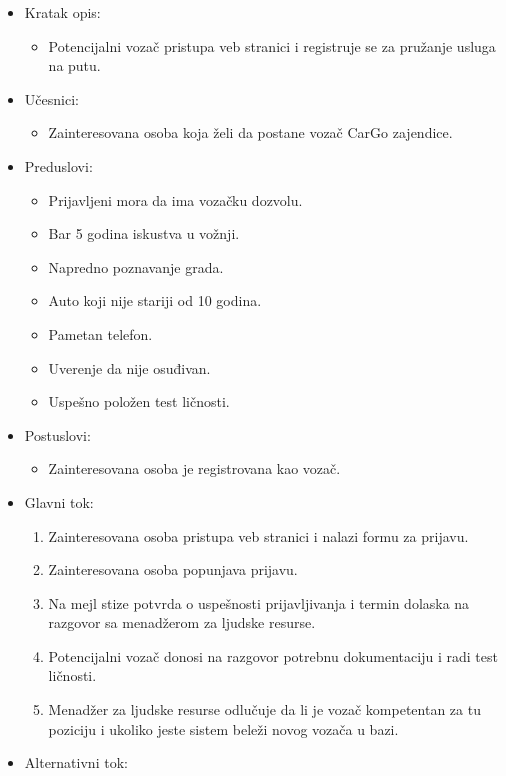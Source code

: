 \begin{itemize}
	\item Kratak opis:
		\begin{itemize}
			\item Potencijalni vozač pristupa veb stranici i registruje se za pružanje usluga na putu.
		\end{itemize}
	\item Učesnici:
		\begin{itemize}
			\item Zainteresovana osoba koja želi da postane vozač CarGo zajendice.
		\end{itemize}				
	\item Preduslovi:
		\begin{itemize}
		    \item Prijavljeni mora da ima vozačku dozvolu.
		    \item Bar 5 godina iskustva u vožnji.
		    \item Napredno poznavanje grada.
		    \item Auto koji nije stariji od 10 godina.
		    \item Pametan telefon.
		    \item Uverenje da nije osuđivan.
		    \item Uspešno položen test ličnosti.
		\end{itemize}
	\item Postuslovi:
		\begin{itemize}
			\item Zainteresovana osoba je registrovana kao vozač.
		\end{itemize}		
	\item Glavni tok:
		\begin{enumerate}
		    \item Zainteresovana osoba pristupa veb stranici i nalazi formu za prijavu.
		    \item Zainteresovana osoba popunjava prijavu.
		    \item Na mejl stize potvrda o uspešnosti prijavljivanja i termin dolaska na razgovor sa menadžerom za ljudske resurse.
		    \item Potencijalni vozač donosi na razgovor potrebnu dokumentaciju i radi test ličnosti.
		    \item Menadžer za ljudske resurse odlučuje da li je vozač kompetentan za tu poziciju i ukoliko jeste sistem beleži novog vozača u bazi.
		\end{enumerate}
	\item Alternativni tok:

\end{itemize}
